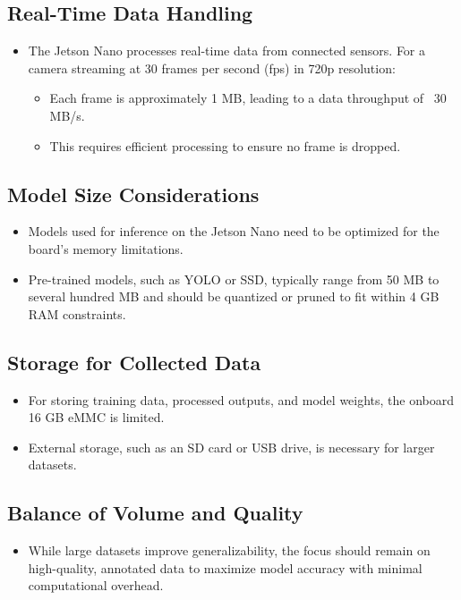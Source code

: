 \subsection*{Real-Time Data Handling}
\begin{itemize}[leftmargin=1.5cm]
	\item The Jetson Nano processes real-time data from connected sensors. For a camera streaming at 30 frames per second (fps) in 720p resolution:
	\begin{itemize}
		\item Each frame is approximately 1 MB, leading to a data throughput of ~30 MB/s.
		\item This requires efficient processing to ensure no frame is dropped.
	\end{itemize}
\end{itemize}

\subsection*{Model Size Considerations}
\begin{itemize}[leftmargin=1.5cm]
	\item Models used for inference on the Jetson Nano need to be optimized for the board’s memory limitations.
	\item Pre-trained models, such as YOLO or SSD, typically range from 50 MB to several hundred MB and should be quantized or pruned to fit within 4 GB RAM constraints.
\end{itemize}

\subsection*{Storage for Collected Data}
\begin{itemize}[leftmargin=1.5cm]
	\item For storing training data, processed outputs, and model weights, the onboard 16 GB eMMC is limited.
	\item External storage, such as an SD card or USB drive, is necessary for larger datasets.
\end{itemize}

\subsection*{Balance of Volume and Quality}
\begin{itemize}[leftmargin=1.5cm]
	\item While large datasets improve generalizability, the focus should remain on high-quality, annotated data to maximize model accuracy with minimal computational overhead.
\end{itemize}

